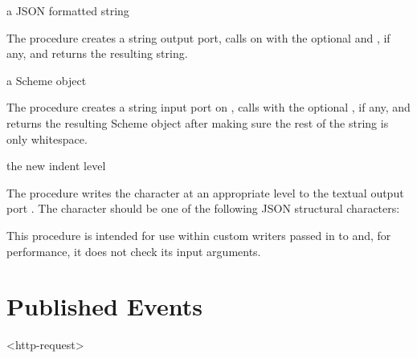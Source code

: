 \begin{procedure}
\end{procedure}
\returns{} a JSON formatted string

The  procedure creates a string output port,
calls  on  with the optional  and
, if any, and returns the resulting string.

\begin{procedure}
\end{procedure}
\returns{} a Scheme object

The  procedure creates a string input port
on , calls  with the optional ,
if any, and returns the resulting Scheme object after making sure the rest
of the string is only whitespace.

\begin{procedure}
\end{procedure}
\returns{} the new indent level

The  procedure writes the character
 at an appropriate  level to the textual output
port . The character should be one of the following JSON
structural characters: \code{[ ] \{ \} : ,}

This procedure is intended for use within custom writers passed in to
 and, for performance, it does not check its input arguments.

\section {Published Events}

\begin{pubevent}{<http-request>}
\end{pubevent}
